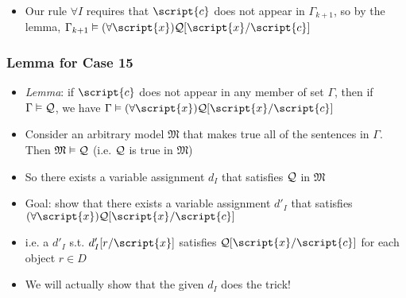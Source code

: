 \begin{frame}
\begin{itemize}[<+->]

\item Our rule $\forall I$ requires that $\script{c}$ does not appear in $\Gamma_{k+1}$, so by the lemma, $\Gamma_{k+1} \entails \qt{\forall}{\script{x}}\metav{Q}\substitute{\script{c}}{\script{x}}$

\end{itemize}
\end{frame}




\begin{frame}
\frametitle{Lemma for Case 15}

\begin{itemize}[<+->]

\item \emph{Lemma}: if $\script{c}$ does not appear in any member of set $\Gamma$, then if $\Gamma \vDash \mathcal{Q}$, we have $\Gamma \entails \qt{\forall}{\script{x}}\metav{Q}\substitute{\script{c}}{\script{x}}$

\item Consider an arbitrary model $\mathfrak{M}$ that makes true all of the sentences in $\Gamma$. Then $\mathfrak{M} \vDash \mathcal{Q}$ (i.e. $\mathcal{Q}$ is true in $\mathfrak{M}$) %

\item So there exists a variable assignment $d_I$ that satisfies $\mathcal{Q}$ in $\mathfrak{M}$


\item Goal: show that there exists a variable assignment $d'_I$ that satisfies $\qt{\forall}{\script{x}}\metav{Q}\substitute{\script{c}}{\script{x}}$
\bi

\item i.e. a $d'_I$ s.t. $d'_I [r/\script{x}]$ satisfies $\metav{Q}\substitute{\script{c}}{\script{x}}$ for each object $r \in D$
\item We will actually show that the given $d_I$ does the trick!
\ei

\end{itemize}
\end{frame}

